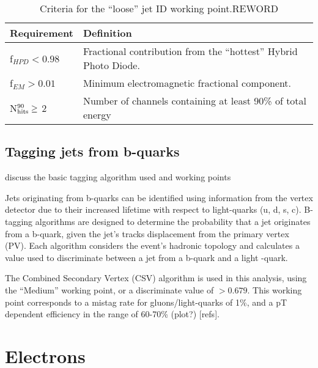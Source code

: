 \begin{table}[!ht]
  \caption{Criteria for the ``loose'' jet ID working point.\label{tab:jet_id_loose}REWORD}
  \footnotesize
  \begin{center}
    \begin{tabular}{ll}
      \hline
      \hline
      Requirement                & Definition                                                       \\
      \hline
      f$_{HPD} < 0.98$           & Fractional contribution from the ``hottest'' Hybrid Photo Diode. \\
      f$_{EM} > 0.01$            & Minimum electromagnetic fractional component.                    \\
      N$^{90}_{\rm hits} \geq$ 2 & Number of channels containing at least 90\% of total energy      \\
      \hline
      \hline
    \end{tabular}
  \end{center}
\end{table}


\subsection{Tagging jets from b-quarks}
discuss the basic tagging algorithm used and working points

Jets originating from b-quarks can be identified using information from the 
vertex detector due to their increased lifetime with respect to light-quarks (u,
d, s, c). 
B-tagging algorithms are designed to determine the probability that a jet 
originates from a b-quark, given the jet's tracks displacement from the primary 
vertex (PV). Each algorithm considers the event's hadronic topology and 
calculates a value used to discriminate between a jet from a b-quark and a light
-quark.

The Combined Secondary Vertex (CSV) algorithm is used in this analysis,
using the ``Medium'' working point, or a discriminate value of $>0.679$. This 
working point corresponds to a mistag rate for gluons/light-quarks of 1\%, and a
pT dependent efficiency in the range of 60-70\% (plot?) [refs].

\section{Electrons}  %
\label{sec:objects_electrons}


